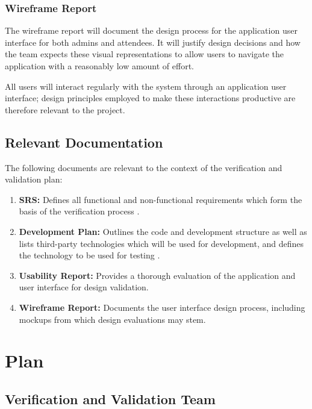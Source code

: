 \documentclass[12pt, titlepage]{article}
\begin{document}
\subsubsection{Wireframe Report}
The wireframe report will document the design process for the application user interface for both admins and attendees.
It will justify design decisions and how the team expects these visual representations to allow users to navigate the
application with a reasonably low amount of effort.

All users will interact regularly with the system through an application user interface; design principles employed to
make these interactions productive are therefore relevant to the project.

\subsection{Relevant Documentation}
The following documents are relevant to the context of the verification and validation plan:
\begin{enumerate}[align=left,
  leftmargin=*,
  labelsep=1em,
  itemindent=0em, font=\bfseries]
  \item {\bfseries SRS:} Defines all functional and non-functional requirements which form the basis of the verification
    process \citep{SRS}.
  \item {\bfseries Development Plan:} Outlines the code and development structure as well as lists third-party
    technologies which will be used for development, and defines the technology to be used for testing \citep{DVP}.
  \item {\bfseries Usability Report:} Provides a thorough evaluation of the application and user interface for design
    validation.
  \item {\bfseries Wireframe Report:} Documents the user interface design process, including mockups from which design
    evaluations may stem.
\end{enumerate}

\section{Plan}


\subsection{Verification and Validation Team}
\end{document}

